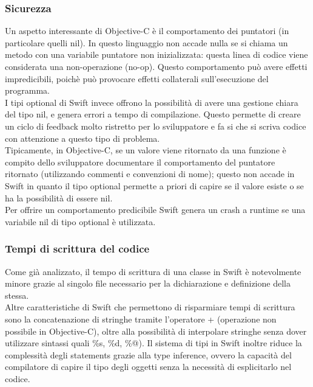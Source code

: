 \subsubsection{Sicurezza} 
Un aspetto interessante di Objective-C è il comportamento dei puntatori (in particolare quelli nil). In questo linguaggio non accade nulla se si chiama un metodo con una variabile puntatore non inizializzata: questa linea di codice viene considerata una non-operazione (no-op). Questo comportamento può avere effetti impredicibili, poichè può provocare effetti collaterali sull'esecuzione del programma.\\
I tipi optional di Swift invece offrono la possibilità di avere una gestione chiara del tipo nil, e genera errori a tempo di compilazione. Questo permette di creare un ciclo di feedback molto ristretto per lo sviluppatore e fa si che si scriva codice con attenzione a questo tipo di problema.\\
Tipicamente, in Objective-C, se un valore viene ritornato da una funzione è compito dello sviluppatore documentare il comportamento del puntatore ritornato (utilizzando commenti e convenzioni di nome); questo non accade in Swift in quanto il tipo optional permette a priori di capire se il valore esiste o se ha la possibilità di essere nil.\\ Per offrire un comportamento predicibile Swift genera un crash a runtime se una variabile nil di tipo optional è utilizzata.\\
\subsubsection{Tempi di scrittura del codice}
Come già analizzato, il tempo di scrittura di una classe in Swift è notevolmente minore grazie al singolo file necessario per la dichiarazione e definizione della stessa.\\Altre caratteristiche di Swift che permettono di risparmiare tempi di scrittura sono la concatenazione di stringhe tramite l'operatore + (operazione non possibile in Objective-C), oltre alla possibilità di interpolare stringhe senza dover utilizzare sintassi quali \%s, \%d, \%@). Il sistema di tipi in Swift inoltre riduce la complessità degli statements grazie alla type inference, ovvero la capacità del compilatore di capire il tipo degli oggetti senza la necessità di esplicitarlo nel codice.
